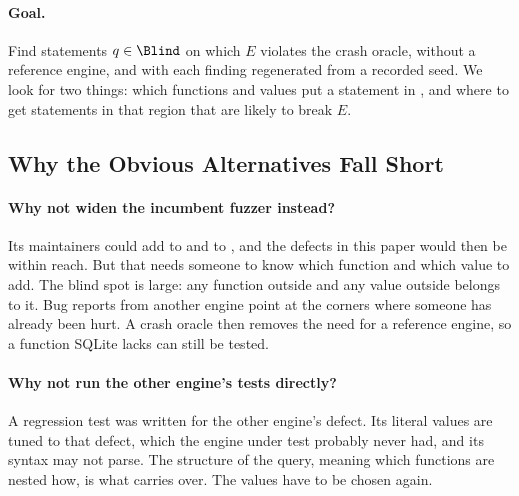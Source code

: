 \paragraph{Goal.} Find statements $q \in \Blind$ on which $E$ violates the crash
oracle, without a reference engine, and with each finding regenerated from a
recorded seed. We look for two things: which functions and values put a
statement in \Blind, and where to get statements in that region that are likely
to break $E$.

\subsection{Why the Obvious Alternatives Fall Short}

\paragraph{Why not widen the incumbent fuzzer instead?} Its maintainers could add
 to \Voc and \imax to \Lit, and the defects in this paper would then be
within reach. But that needs someone to know which function and which value to
add. The blind spot is large: any function outside \Voc and any value outside
\Lit belongs to it. Bug reports from another engine point at the corners where
someone has already been hurt. A crash oracle then removes the need for a
reference engine, so a function SQLite lacks can still be tested.

\paragraph{Why not run the other engine's tests directly?} A regression test was
written for the other engine's defect. Its literal values are tuned to that
defect, which the engine under test probably never had, and its syntax may not
parse. The structure of the query, meaning which functions are nested how, is
what carries over. The values have to be chosen again.
